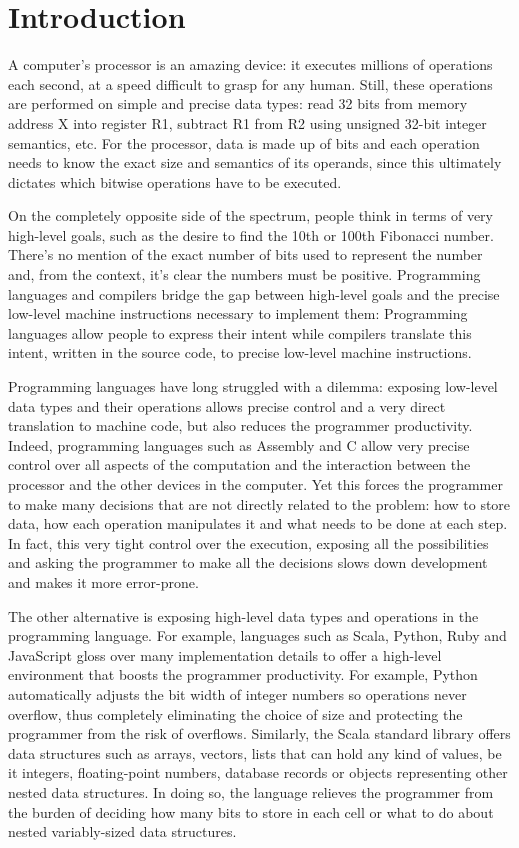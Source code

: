 \chapter{Introduction}

A computer's processor is an amazing device: it executes millions of operations each second, at a speed difficult to grasp for any human. Still, these operations are performed on simple and precise data types: read 32 bits from memory address X into register R1, subtract R1 from R2 using unsigned 32-bit integer semantics, etc. For the processor, data is made up of bits and each operation needs to know the exact size and semantics of its operands, since this ultimately dictates which bitwise operations have to be executed.

On the completely opposite side of the spectrum, people think in terms of very high-level goals, such as the desire to find the 10th or 100th Fibonacci number. There's no mention of the exact number of bits used to represent the number and, from the context, it's clear the numbers must be positive. Programming languages and compilers bridge the gap between high-level goals and the precise low-level machine instructions necessary to implement them: Programming languages allow people to express their intent while compilers translate this intent, written in the source code, to precise low-level machine instructions.

Programming languages have long struggled with a dilemma: exposing low-level data types and their operations allows precise control and a very direct translation to machine code, but also reduces the programmer productivity. Indeed, programming languages such as Assembly and C allow very precise control over all aspects of the computation and the interaction between the processor and the other devices in the computer. Yet this forces the programmer to make many decisions that are not directly related to the problem: how to store data, how each operation manipulates it and what needs to be done at each step. In fact, this very tight control over the execution, exposing all the possibilities and asking the programmer to make all the decisions slows down  development and makes it more error-prone.

The other alternative is exposing high-level data types and operations in the programming language. For example, languages such as Scala, Python, Ruby and JavaScript gloss over many implementation details to offer a high-level environment that boosts the programmer productivity. For example, Python automatically adjusts the bit width of integer numbers so operations never overflow, thus completely eliminating the choice of size and protecting the programmer from the risk of overflows. Similarly, the Scala standard library offers data structures such as arrays, vectors, lists that can hold any kind of values, be it integers, floating-point numbers, database records or objects representing other nested data structures. In doing so, the language relieves the programmer from the burden of deciding how many bits to store in each cell or what to do about nested variably-sized data structures.

